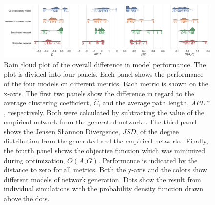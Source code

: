\documentclass[11pt]{article}
\begin{document}
\begin{figure}[H]
    \centering
    \includegraphics[width=.99\linewidth]{../plots/overall/Model_Evaluation_Overview.pdf}
  \caption{Rain cloud plot of the overall difference in model performance. The plot is divided into four panels. Each panel shows the performance of the four models on different metrics. Each metric is shown on the x-axis. The first two panels show the difference in regard to the average clustering coefficient, $\overline{C}$, and the average path length, $APL*$, respectively. Both were calculated by subtracting the value of the empirical network from the generated networks. The third panel shows the Jensen Shannon Divergence, $JSD$, of the degree distribution from the generated and the empirical networks. Finally, the fourth panel shows the objective function which was minimized during optimization, $O(A,G)$. Performance is indicated by the distance to zero for all metrics. Both the y-axis and the colors show different models of network generation. Dots show the result from individual simulations with the probability density function drawn above the dots.}
  \label{fig:eval_overall}
\end{figure}
\end{document}
